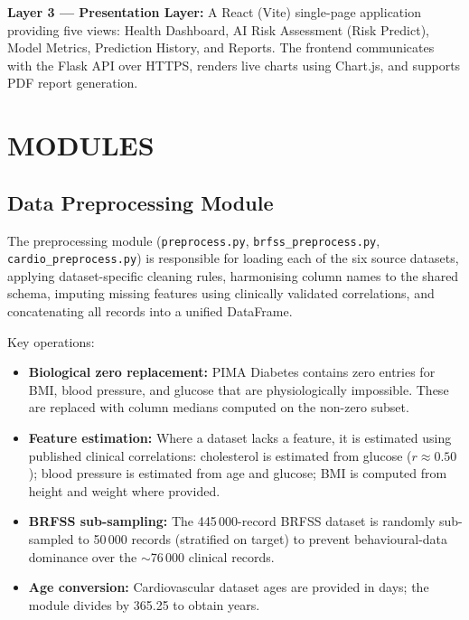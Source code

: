 \documentclass[12pt,a4paper]{report}
\begin{document}
\textbf{Layer 3 — Presentation Layer:} A React (Vite) single-page application providing five views: Health Dashboard, AI Risk Assessment (Risk Predict), Model Metrics, Prediction History, and Reports. The frontend communicates with the Flask API over HTTPS, renders live charts using Chart.js, and supports PDF report generation.

\chapter{MODULES}

\section{Data Preprocessing Module}

The preprocessing module (\texttt{preprocess.py}, \texttt{brfss\_preprocess.py}, \texttt{cardio\_preprocess.py}) is responsible for loading each of the six source datasets, applying dataset-specific cleaning rules, harmonising column names to the shared schema, imputing missing features using clinically validated correlations, and concatenating all records into a unified DataFrame.

Key operations:
\begin{itemize}[leftmargin=*]
  \item \textbf{Biological zero replacement:} PIMA Diabetes contains zero entries for BMI, blood pressure, and glucose that are physiologically impossible. These are replaced with column medians computed on the non-zero subset.
  \item \textbf{Feature estimation:} Where a dataset lacks a feature, it is estimated using published clinical correlations: cholesterol is estimated from glucose ($r \approx 0.50$); blood pressure is estimated from age and glucose; BMI is computed from height and weight where provided.
  \item \textbf{BRFSS sub-sampling:} The 445\,000-record BRFSS dataset is randomly sub-sampled to 50\,000 records (stratified on target) to prevent behavioural-data dominance over the $\sim$76\,000 clinical records.
  \item \textbf{Age conversion:} Cardiovascular dataset ages are provided in days; the module divides by 365.25 to obtain years.
\end{itemize}
\end{document}
